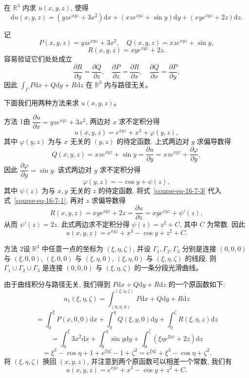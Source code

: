 \documentclass[12pt,fontset=fandol]{ctexart}
\begin{document}
\begin{example}\label{course-example-16-7-3}\quad 在 $\mathbb R^3$ 内求 $u(x,y,z)$, 使得
\[
  \mathrm du(x,y,z)=(yze^{xyz}+3x^2)\mathrm dx+(xze^{xyz}+\sin y)\mathrm dy+(xye^{xyz}+2z)\mathrm dz.
\]

\end{example}
\begin{solve}\quad 记
\[
  P(x,y,z)=yze^{xyz}+3x^2,\quad Q(x,y,z)=xze^{xyz}+\sin y,
\]
\[
  R(x,y,z)=xye^{xyz}+2z.
\]
容易验证它们处处成立
\[
  \frac{\partial R}{\partial y}=\frac{\partial Q}{\partial z},\quad
  \frac{\partial P}{\partial z}=\frac{\partial R}{\partial x},\quad
  \frac{\partial Q}{\partial x}=\frac{\partial P}{\partial y},
\]
因此 $\int_\Gamma P\mathrm dx+Q\mathrm dy+R\mathrm dz$ 在 $\mathbb R^3$ 内与路径无关。

下面我们用两种方法来求 $u(x,y,z)$。

方法 1\quad 由 $\dfrac{\partial u}{\partial x}=yze^{xyz}+3x^2$, 两边对 $x$ 求不定积分得
\begin{equation}
  u(x,y,z)=e^{xyz}+x^3+\varphi(y,z),
  \label{course-eq-16-7-1}
\end{equation}
其中 $\varphi(y,z)$ 为与 $x$ 无关的 $(y,z)$ 的待定函数. 上式两边对 $y$ 求偏导数得
\begin{equation}
  Q(x,y,z)=xze^{xyz}+\sin y
  =\frac{\partial u}{\partial y}
  =xze^{xyz}+\frac{\partial\varphi}{\partial y},
  \label{course-eq-16-7-2}
\end{equation}
因此 $\dfrac{\partial\varphi}{\partial y}=\sin y$. 该式两边对 $y$ 求不定积分得
\begin{equation}
  \varphi(y,z)=-\cos y+\psi(z),
  \label{course-eq-16-7-3}
\end{equation}
其中 $\psi(z)$ 为与 $x,y$ 无关的 $z$ 的待定函数. 将式~\eqref{course-eq-16-7-3}  代入式~\eqref{course-eq-16-7-1}, 再对 $z$ 求偏导数得
\[
  R(x,y,z)=xye^{xyz}+2z=\frac{\partial u}{\partial z}=xye^{xyz}+\psi'(z),
\]
从而 $\psi'(z)=2z$. 此式两边求不定积分得 $\psi(z)=z^2+C$, 其中 $C$ 为常数. 因此
\[
  u(x,y,z)=e^{xyz}+x^3-\cos y+z^2+C.
\]

方法 2\quad 设 $\mathbb R^3$ 中任意一点的坐标为 $(\xi,\eta,\zeta)$, 并设 $\Gamma_1,\Gamma_2,\Gamma_3$ 分别是连接 $(0,0,0)$ 与 $(\xi,0,0)$, $(\xi,0,0)$ 与 $(\xi,\eta,0)$, $(\xi,\eta,0)$ 与 $(\xi,\eta,\zeta)$ 的线段, 则 $\Gamma_1\cup\Gamma_2\cup\Gamma_3$ 是连接 $(0,0,0)$ 与 $(\xi,\eta,\zeta)$ 的一条分段光滑曲线。

由于曲线积分与路径无关, 我们得到 $P\mathrm dx+Q\mathrm dy+R\mathrm dz$ 的一个原函数如下:
\[
  u_1(\xi,\eta,\zeta)
  =\int_{(0,0,0)}^{(\xi,\eta,\zeta)}P\mathrm dx+Q\mathrm dy+R\mathrm dz
\]
\[
  =\int_0^\xi P(x,0,0)\mathrm dx
  +\int_0^\eta Q(\xi,y,0)\mathrm dy
  +\int_0^\zeta R(\xi,\eta,z)\mathrm dz
\]
\[
  =\int_0^\xi 3x^2\mathrm dx+\int_0^\eta\sin y\mathrm dy
  +\int_0^\zeta(\xi\eta e^{\xi\eta z}+2z)\mathrm dz
\]
\[
  =\xi^3-\cos\eta+1+e^{\xi\eta\zeta}-1+\zeta^2
  =e^{\xi\eta\zeta}+\xi^3-\cos\eta+\zeta^2.
\]
将 $(\xi,\eta,\zeta)$ 换回 $(x,y,z)$, 并注意到两个原函数可以相差一个常数, 我们有
\[
  u(x,y,z)=e^{xyz}+x^3-\cos y+z^2+C.
\]

\end{solve}
\end{document}
